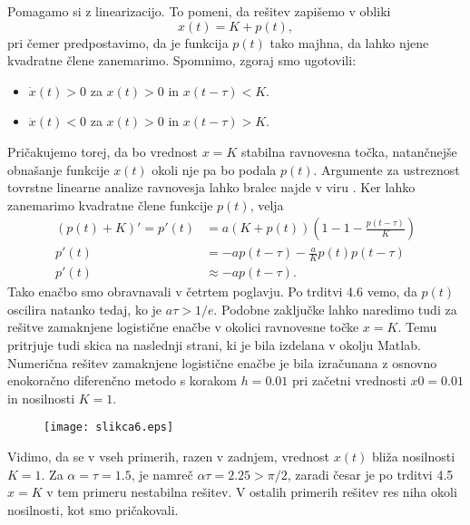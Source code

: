 \documentclass[12pt,a4paper]{amsart}
\theoremstyle{definition} %
\theoremstyle{plain} %
\begin{document}
Pomagamo si z linearizacijo. To pomeni, da rešitev zapišemo v obliki $$x(t)=K+p(t),$$ pri čemer predpostavimo, da je 
funkcija $p(t)$ tako majhna, da lahko njene kvadratne člene zanemarimo. Spomnimo, zgoraj smo ugotovili:
\begin{itemize}
    \item $\dot{x}(t)>0$ za $x(t)>0$ in $x(t-\tau)<K$.
    \item $\dot{x}(t)<0$ za $x(t)>0$ in $x(t-\tau)>K$.
\end{itemize}
Pričakujemo torej, da bo vrednost $x=K$ stabilna ravnovesna točka, natančnejše obnašanje funkcije $x(t)$ okoli nje pa bo 
podala $p(t)$. Argumente za ustreznost tovrstne linearne analize ravnovesja lahko bralec najde v viru \cite{analiza}.
Ker lahko zanemarimo kvadratne člene funkcije $p(t)$, velja
\begin{equation*}
    \begin{split}
        (p(t)+K)'= p'(t) &=  a(K+p(t))\left(1-1-\frac{p(t-\tau)}{K}\right) \\
        p'(t) &= -ap(t-\tau)-\frac{a}{K}p(t)p(t-\tau) \\
        p'(t) &\approx -ap(t-\tau).
    \end{split}
\end{equation*}
Tako enačbo smo obravnavali v četrtem poglavju. Po trditvi 4.6 vemo, da $p(t)$ oscilira natanko tedaj, ko je 
$a\tau>1/e$.
Podobne zaključke lahko naredimo tudi za rešitve zamaknjene logistične enačbe v okolici ravnovesne točke $x=K$. 
Temu pritrjuje tudi skica na naslednji strani, ki je bila izdelana v okolju Matlab.
Numerična rešitev zamaknjene logistične enačbe je bila izračunana z osnovno enokoračno
difere\-nčno metodo s korakom
$h=0.01$ pri začetni vrednosti $x0=0.01$ in nosilnosti $K=1$.






\begin{figure}[H]
    \texttt{[image: slikca6.eps]}
\end{figure}

Vidimo, da se v vseh primerih, razen v zadnjem, vrednost $x(t)$ bliža nosilnosti $K=1$. Za $\alpha=\tau=1.5$, je namreč
$\alpha\tau=2.25>\pi/2$, zaradi česar je po trditvi 4.5 $x=K$ v tem primeru nestabilna rešitev. V ostalih primerih 
rešitev res niha okoli nosilnosti, kot smo pričakovali.



\overfullrule=0mm\printbibliography
\end{document}
